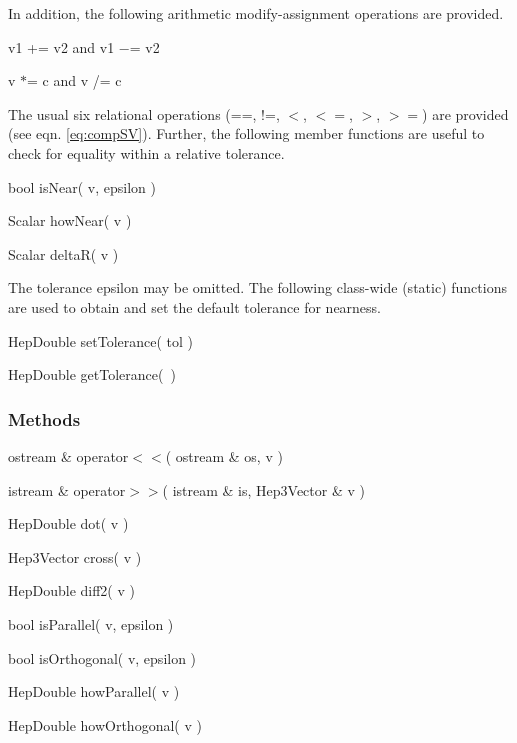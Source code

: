 \noindent
In addition, 
the following arithmetic modify-assignment operations are provided.

\begin{shortlist}
  \item v1 += v2  and  v1 $-$= v2
  \item v $*$= c  and  v /= c
\end{shortlist}

\noindent
The usual six relational operations
(==, !=, $<$, $<=$, $>$, $>=$) are provided (see eqn. \ref{eq:compSV}).
Further, the following member functions are useful to check for equality
within a relative tolerance.

\begin{shortlist}
  \item bool isNear( v, epsilon ) \see{\ref{eq:isNear}}
  \item Scalar howNear( v ) \see{\ref{eq:howNear}, \ref{eq:howNear:2}, \ref{eq:howNear:3}}
  \item Scalar deltaR( v ) \see{\ref{eq:deltaR}}
\end{shortlist}

\noindent
The tolerance epsilon may be omitted.
The following class-wide (static) functions are used
to obtain and set the default tolerance for nearness.

\begin{shortlist}
  \item HepDouble setTolerance( tol )	\see{\ref{eq:epsildef}}
  \item HepDouble getTolerance(~)
\end{shortlist}


\subsubsection{Methods}

\begin{shortlist}
  \item ostream \& operator$<<$( ostream \& os, v )
  \item istream \& operator$>>$( istream \& is, Hep3Vector \& v )
\end{shortlist}
\begin{shortlist}
  \item HepDouble dot( v ) \see{\ref{eq:dot}}
  \item Hep3Vector cross( v ) \see{\ref{eq:cross}}
  \item HepDouble diff2( v ) \see{\ref{eq:diff2}}
  \item bool isParallel( v, epsilon ) \see{\ref{eq:isPar}}
  \item bool isOrthogonal( v, epsilon ) \see{\ref{eq:isOrtho}}
  \item HepDouble howParallel( v ) \see{\ref{eq:howPar}, \ref{eq:howPar:2}}
  \item HepDouble howOrthogonal( v ) \see{\ref{eq:howOrtho}, \ref{eq:howOrtho:2}}
\end{shortlist}

